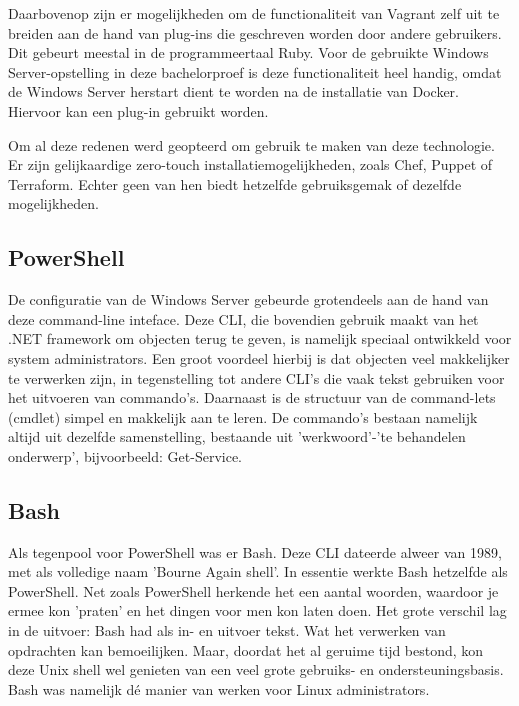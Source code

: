 Daarbovenop zijn er mogelijkheden om de functionaliteit van Vagrant zelf uit te breiden aan de hand van plug-ins die geschreven worden door andere gebruikers. Dit gebeurt meestal in de programmeertaal Ruby. Voor de gebruikte Windows Server-opstelling in deze bachelorproef is deze functionaliteit heel handig, omdat de Windows Server herstart dient te worden na de installatie van Docker. Hiervoor kan een plug-in gebruikt worden.

Om al deze redenen werd geopteerd om gebruik te maken van deze technologie. Er zijn gelijkaardige zero-touch installatiemogelijkheden, zoals Chef, Puppet of Terraform. Echter geen van hen biedt hetzelfde gebruiksgemak of dezelfde mogelijkheden.

\subsection{PowerShell}
De configuratie van de Windows Server gebeurde grotendeels aan de hand van deze command-line inteface. Deze CLI, die bovendien gebruik maakt van het .NET framework om objecten terug te geven, is namelijk speciaal ontwikkeld voor system administrators. Een groot voordeel hierbij is dat objecten veel makkelijker te verwerken zijn, in tegenstelling tot andere CLI’s die vaak tekst gebruiken voor het uitvoeren van commando’s. Daarnaast is de structuur van de command-lets (cmdlet) simpel en makkelijk aan te leren. De commando’s bestaan namelijk altijd uit dezelfde samenstelling, bestaande uit 'werkwoord'-'te behandelen onderwerp', bijvoorbeeld: Get-Service.

\subsection{Bash}
Als tegenpool voor PowerShell was er Bash. Deze CLI dateerde alweer van 1989, met als volledige naam 'Bourne Again shell'. In essentie werkte Bash hetzelfde als PowerShell. Net zoals PowerShell herkende het een aantal woorden, waardoor je ermee kon 'praten' en het dingen voor men kon laten doen. Het grote verschil lag in de uitvoer: Bash had als in- en uitvoer tekst. Wat het verwerken van opdrachten kan bemoeilijken. Maar, doordat het al geruime tijd bestond, kon deze Unix shell wel genieten van een veel grote gebruiks- en ondersteuningsbasis. Bash was namelijk dé manier van werken voor Linux administrators.


